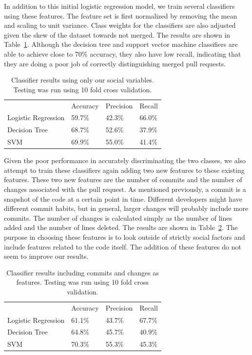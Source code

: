 \documentclass[12pt]{article}
\begin{document}
In addition to this initial logistic regression model, we train several
classifiers using these features. The feature set is first normalized by
removing the mean and scaling to unit variance. Class weights for the
classifiers are also adjusted given the skew of the dataset towards not merged.
The results are shown in Table~\ref{classifier_initial}. Although the decision
tree and support vector machine classifiers are able to achieve close to 70\%
accuracy, they also have low recall, indicating that they are doing a poor job
of correctly distinguishing merged pull requests.

\begin{table}[!htbp] \centering
\caption{Classifier results using only our social variables. Testing was run using 10 fold cross validation.}
\label{classifier_initial}
\begin{tabular}{|l|l|l|l|}
\hline
~                   & Accuracy & Precision & Recall \\
    Logistic Regression & 59.7\%   & 42.3\%    & 66.0\% \\
    Decision Tree       & 68.7\%   & 52.6\%    & 37.9\% \\
    SVM                 & 69.9\%   & 55.0\%    & 41.4\% \\ \hline
\end{tabular}
\end{table}

Given the poor performance in accurately discriminating the two classes, we also
attempt to train these classifiers again adding two new features to these
existing features. These two new features are the number of commits and the
number of changes associated with the pull request. As mentioned previously, a
commit is a snapshot of the code at a certain point in time. Different
developers might have different commit habits, but in general, larger changes
will probably include more commits. The number of changes is calculated simply
as the number of lines added and the number of lines deleted. The results are
shown in Table~\ref{classifier_updated}. The purpose in choosing these features
is to look outside of strictly social factors and include features related to
the code itself. The addition of these features do not seem to improve our
results.

\begin{table}[!htbp] \centering
\caption{Classifier results including commits and changes as features. Testing was run using 10 fold cross validation.}
\label{classifier_updated}
\begin{tabular}{|l|l|l|l|}
\hline
~                   & Accuracy & Precision & Recall \\
    Logistic Regression & 61.1\%   & 43.7\%    & 67.7\% \\
    Decision Tree       & 64.8\%   & 45.7\%    & 40.9\% \\
    SVM                 & 70.3\%   & 55.3\%    & 45.3\% \\ \hline
\end{tabular}
\end{table}
\end{document}
